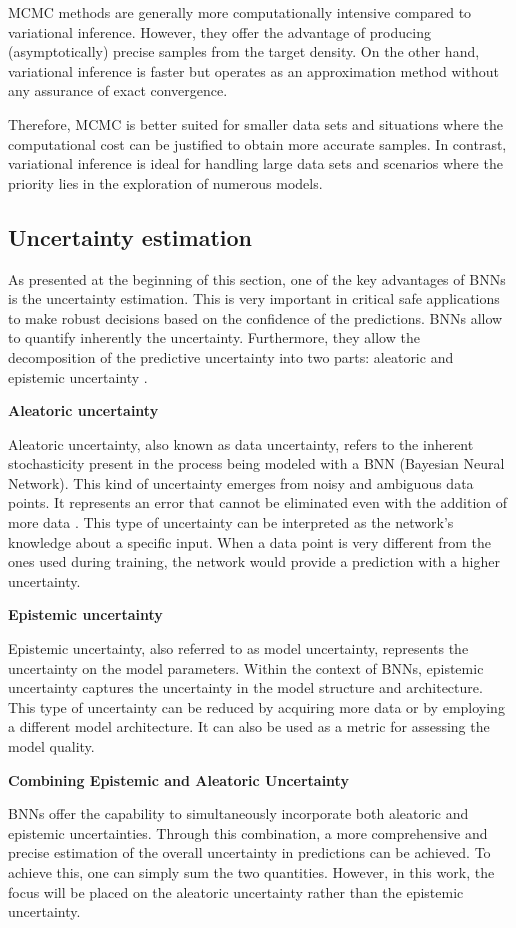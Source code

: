 MCMC methods are generally more computationally intensive compared to variational inference. However, they offer the advantage of producing (asymptotically) precise samples from the target density. On the other hand, variational inference is faster but operates as an approximation method without any assurance of exact convergence.

Therefore, MCMC is better suited for smaller data sets and situations where the computational cost can be justified to obtain more accurate samples. In contrast, variational inference is ideal for handling large data sets and scenarios where the priority lies in the exploration of numerous models.

\subsection{Uncertainty estimation}

As presented at the beginning of this section, one of the key advantages of BNNs is the uncertainty estimation. This is very important in critical safe applications to make robust decisions based on the confidence of the predictions. BNNs allow to quantify inherently the uncertainty. Furthermore, they allow the decomposition of the predictive uncertainty into two parts: aleatoric and epistemic uncertainty \cite{Mitros2019OnTV}.

\vspace{0.2cm}
\textbf{Aleatoric uncertainty}

Aleatoric uncertainty, also known as data uncertainty, refers to the inherent stochasticity present in the process being modeled with a BNN (Bayesian Neural Network). This kind of uncertainty emerges from noisy and ambiguous data points. It represents an error that cannot be eliminated even with the addition of more data \cite{article01}. This type of uncertainty can be interpreted as the network's knowledge about a specific input. When a data point is very different from the ones used during training, the network would provide a prediction with a higher uncertainty.

\vspace{0.2cm}
\textbf{Epistemic uncertainty}

Epistemic uncertainty, also referred to as model uncertainty, represents the uncertainty on the model parameters. Within the context of BNNs, epistemic uncertainty captures the uncertainty in the model structure and architecture. This type of uncertainty can be reduced by acquiring more data or by employing a different model architecture. It can also be used as a metric for assessing the model quality.

\vspace{0.2cm}
\textbf{Combining Epistemic and Aleatoric Uncertainty}

BNNs offer the capability to simultaneously incorporate both aleatoric and epistemic uncertainties. Through this combination, a more comprehensive and precise estimation of the overall uncertainty in predictions can be achieved. To achieve this, one can simply sum the two quantities. However, in this work, the focus will be placed on the aleatoric uncertainty rather than the epistemic uncertainty.